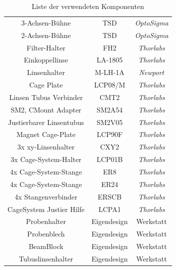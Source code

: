 \documentclass[titlepage]{article}
\begin{document}
\begin{table}[h!]
\begin{tabular}{|c|c|c|}
		3-Achsen-Bühne           & TSD                            & \textit{OptoSigma}                     \\
		2-Achsen-Bühne           & TSD                            & \textit{OptoSigma}                     \\
		Filter-Halter            & FH2                            & \textit{Thorlabs}                      \\
		Einkoppellinse           & LA-1805                        & \textit{Thorlabs}                      \\
		Linsenhalter             & M-LH-1A                        & \textit{Newport}                       \\
		Cage Plate               & LCP08/M                        & \textit{Thorlabs}                      \\
		Linsen Tubus Verbinder   & CMT2                           & \textit{Thorlabs}                      \\
		SM2, CMount Adapter      & SM2A54                         & \textit{Thorlabs}                      \\
		Justierbarer Linsentubus & SM2V05                         & \textit{Thorlabs}                      \\
		Magnet Cage-Plate        & LCP90F                         & \textit{Thorlabs}                      \\
		3x xy-Linsenhalter       & CXY2                           & \textit{Thorlabs}                      \\
		3x Cage-System-Halter    & LCP01B                         & \textit{Thorlabs}                      \\
		4x Cage-System-Stange    & ER8                            & \textit{Thorlabs}                      \\
		4x Cage-System-Stange    & ER24                           & \textit{Thorlabs}                      \\
		4x Stangenverbinder      & ERSCB                          & \textit{Thorlabs}                      \\
		CageSystem Justier Hilfe & LCPA1                          & \textit{Thorlabs}                      \\		
		Probenhalter		     & Eigendesign                    & Werkstatt                              \\
		Probenblech              & Eigendesign                    & Werkstatt                              \\
		BeamBlock                & Eigendesign                    & Werkstatt                              \\
		Tubuslinsenhalter        & Eigendesign                    & Werkstatt                              \\
		\hline          
	\end{tabular}
	\caption{Liste der verwendeten Komponenten}
\end{table}

	
\end{document}
